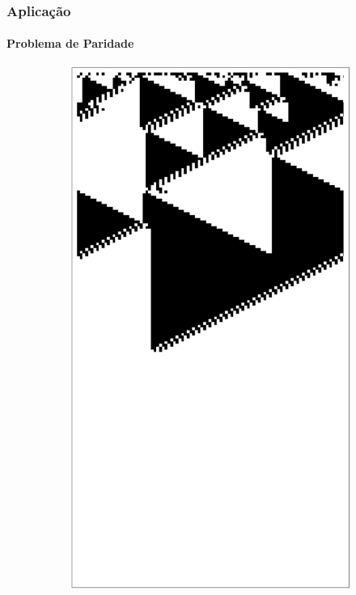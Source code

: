 \documentclass[aspectratio=43]{beamer}
\begin{document}
\begin{frame}
    \frametitle{Aplicação}
    \framesubtitle{Problema de Paridade}

        \begin{figure}
        \centering
        \setcounter{subfigure}{0}
        \begin{subfigure}{0.20\textwidth}
            \includegraphics[width=\linewidth]{regra-1-par}

\end{subfigure}
\end{figure}
\end{frame}
\end{document}
